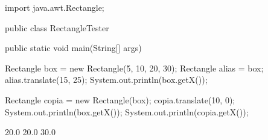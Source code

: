 \begin{unipdcode}[language=Java]
import java.awt.Rectangle;

public class RectangleTester {
    public static void main(String[] args) {
        Rectangle box = new Rectangle(5, 10, 20, 30);
        Rectangle alias = box;
        alias.translate(15, 25);
        System.out.println(box.getX());

        Rectangle copia = new Rectangle(box);
        copia.translate(10, 0);
        System.out.println(box.getX());
        System.out.println(copia.getX());
    }
}
\end{unipdcode}
\begin{unipdterminal}
20.0
20.0
30.0
\end{unipdterminal}
